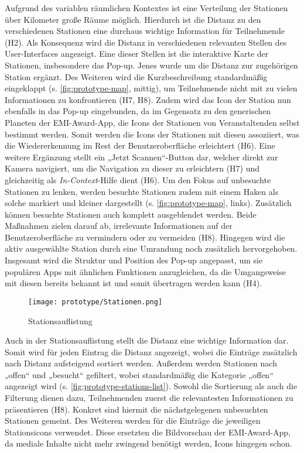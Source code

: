 Aufgrund des variablen räumlichen Kontextes ist eine Verteilung der Stationen
über Kilometer große Räume möglich. Hierdurch ist die Distanz zu den
verschiedenen Stationen eine durchaus wichtige Information für Teilnehmende
(H2). Als Konsequenz wird die Distanz in verschiedenen relevanten Stellen des
User-Interfaces angezeigt. Eine dieser Stellen ist die interaktive Karte der
Stationen, insbesondere das Pop-up. Jenes wurde um die Distanz zur zugehörigen
Station ergänzt. Des Weiteren wird die Kurzbeschreibung standardmäßig
eingeklappt (s. \autoref{fig:prototype-map}, mittig), um Teilnehmende nicht mit
zu vielen Informationen zu konfrontieren (H7, H8). Zudem wird das Icon der
Station nun ebenfalls in das Pop-up eingebunden, da im Gegensatz zu den
generischen Planeten der EMI-Award-App, die Icons der Stationen von
Veranstaltenden selbst bestimmt werden. Somit werden die Icons der Stationen mit
diesen assoziiert, was die Wiedererkennung im Rest der Benutzeroberfläche
erleichtert (H6). Eine weitere Ergänzung stellt ein „Jetzt Scannen“-Button dar,
welcher direkt zur Kamera navigiert, um die Navigation zu dieser zu erleichtern
(H7) und gleichzeitig als \textit{In-Context}-Hilfe dient (H6). Um den Fokus auf
unbesuchte Stationen zu lenken, werden besuchte Stationen zudem mit einem Haken
als solche markiert und kleiner dargestellt (s. \autoref{fig:prototype-map},
links). Zusätzlich können besuchte Stationen auch komplett ausgeblendet werden.
Beide Maßnahmen zielen darauf ab, irrelevante Informationen auf der
Benutzeroberfläche zu vermindern oder zu vermeiden (H8). Hingegen wird die aktiv
ausgewählte Station durch eine Umrandung noch zusätzlich hervorgehoben.
Insgesamt wird die Struktur und Position des Pop-up angepasst, um sie populären
Apps mit ähnlichen Funktionen anzugleichen, da die Umgangsweise mit diesen
bereits bekannt ist und somit übertragen werden kann (H4).

\begin{figure}[htpb]
    \centering
    \texttt{[image: prototype/Stationen.png]}
    \caption{Stationsauflistung}
    \label{fig:prototype-stations-list}
\end{figure}

Auch in der Stationsauflistung stellt die Distanz eine wichtige Information dar.
Somit wird für jeden Eintrag die Distanz angezeigt, wobei die Einträge
zusätzlich nach Distanz aufsteigend sortiert werden. Außerdem werden Stationen
nach „offen“ und „besucht“ gefiltert, wobei standardmäßig die Kategorie „offen“
angezeigt wird (s. \autoref{fig:prototype-stations-list}). Sowohl die Sortierung als auch die Filterung dienen dazu,
Teilnehmenden zuerst die relevantesten Informationen zu präsentieren (H8).
Konkret sind hiermit die nächstgelegenen unbesuchten Stationen gemeint. Des
Weiteren werden für die Einträge die jeweiligen Stationsicons verwendet. Diese
ersetzten die Bildvorschau der EMI-Award-App, da mediale Inhalte nicht mehr
zwingend benötigt werden, Icons hingegen schon.

